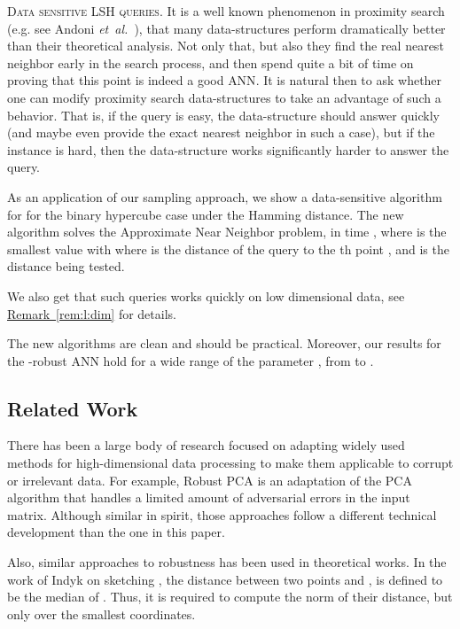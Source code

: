 \documentclass[12pt]{article}\usepackage[cm]{fullpage}
\newcommand{\etal}{\textit{et~al.}\xspace}
\newcommand{\Term}[1]{\textsf{#1}}
\theoremstyle{remark}\theoremheaderfont{\sf}\theorembodyfont{\upshape}\newtheorem{defn}[theorem]{Definition}
\numberwithin{figure}{section}\numberwithin{table}{section}\numberwithin{equation}{section}
\newcommand{\HLink}[2]{\hyperref[#2]{#1~\ref*{#2}}}
\newcommand{\remref}[1]{\HLink{Remark}{rem:#1}}
\renewcommand{\th}{th\xspace}
\newcommand{\ANN}{\Term{ANN}\xspace}\newcommand{\NN}{\Term{NN}\xspace}
\begin{document}
\begin{compactenum}[(A)]
    \smallskip \item \textsc{Data sensitive L{S}H queries.} It is a well known phenomenon in proximity search (e.g. see Andoni
    \etal~\cite[Section 4.5]{adiim-lshus-06}), that many
    data-structures perform dramatically better than their theoretical
    analysis. Not only that, but also they find the real nearest
    neighbor early in the search process, and then spend quite a bit
    of time on proving that this point is indeed a good \ANN. It is
    natural then to ask whether one can modify proximity search
    data-structures to take an advantage of such a behavior. That is,
    if the query is easy, the data-structure should answer quickly
    (and maybe even provide the exact nearest neighbor in such a
    case), but if the instance is hard, then the data-structure works
    significantly harder to answer the query.
    
    As an application of our sampling approach, we show a
    data-sensitive algorithm for \LSH for the binary hypercube case
    under the Hamming distance. The new algorithm solves the
    Approximate Near Neighbor problem, in time
    , where  is the smallest
    value with 
    where  is the distance of the query 
    to the \th point , and  is the
    distance being tested.

    We also get that such \LSH queries works quickly on low
    dimensional data, see \remref{l:dim} for details.
\end{compactenum}\smallskip The new algorithms are clean and should be practical.  Moreover, our
results for the -robust \ANN hold for a wide range of the parameter
, from  to .





\subsection{Related Work}
There has been a large body of research focused on adapting widely
used methods for high-dimensional data processing to make them
applicable to corrupt or irrelevant data. For example, Robust PCA
\cite{clmw-rpca-11} is an adaptation of the PCA algorithm that handles
a limited amount of adversarial errors in the input matrix. Although
similar in spirit, those approaches follow a different technical
development than the one in this paper.

Also, similar approaches to robustness has been used in theoretical
works. In the work of Indyk on  sketching \cite{i-sdpge-06}, the
distance between two points  and , is defined to be the median
of . Thus, it is required to compute the
 norm of their distance, but only over the smallest 
coordinates.
\end{document}
